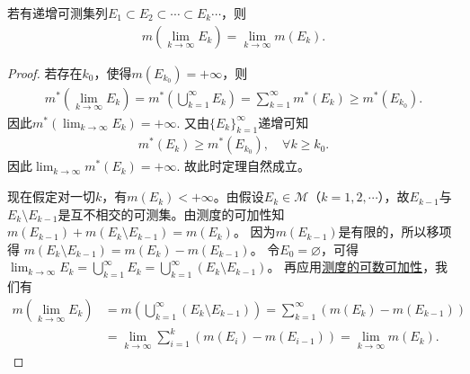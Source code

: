 \documentclass[../../main.tex]{subfiles}
\begin{document}
\begin{theorem}[递增可测集列的测度运算]\label{theorem:递增可测集列的测度运算}
若有递增可测集列$E_1\subset E_2\subset\cdots\subset E_k\cdots$，则
\begin{align}
m\left(\lim_{k\to\infty}E_k\right)=\lim_{k\to\infty}m(E_k).\label{eq:2.4}
\end{align}
\end{theorem}
\begin{proof}
若存在$k_0$，使得$m(E_{k_0})=+\infty$，则
\begin{align*}
m^*\left(\lim_{k\rightarrow \infty}E_k\right) = m^*\left(\bigcup_{k=1}^{\infty}E_k\right) = \sum_{k=1}^{\infty}m^*(E_k) \geqslant m^*(E_{k_0}).
\end{align*}
因此$m^*\left(\lim_{k\rightarrow \infty}E_k\right) = +\infty$. 又由$\{E_k\}_{k=1}^{\infty}$递增可知
\begin{align*}
m^*(E_k) \geqslant m^*(E_{k_0}), \quad \forall k \geqslant k_0.
\end{align*}
因此$\lim_{k\rightarrow \infty}m^*(E_k) = +\infty$.
故此时定理自然成立。

现在假定对一切$k$，有$m(E_k)<+\infty$。由假设$E_k\in\mathscr{M}$（$k = 1,2,\cdots$），故$E_{k - 1}$与$E_k\setminus E_{k - 1}$是互不相交的可测集。由测度的可加性知
$m(E_{k - 1})+m(E_k\setminus E_{k - 1})=m(E_k)$。
因为$m(E_{k - 1})$是有限的，所以移项得
$m(E_k\setminus E_{k - 1})=m(E_k)-m(E_{k - 1})$。
令$E_0 = \varnothing$，可得
$\lim_{k\to\infty}E_k=\bigcup_{k = 1}^{\infty}E_k=\bigcup_{k = 1}^{\infty}(E_k\setminus E_{k - 1})$。
再应用\hyperref[theorem:测度的基本性质]{测度的可数可加性}，我们有
\begin{align*}
m\left(\lim_{k\to\infty}E_k\right)&=m\left(\bigcup_{k = 1}^{\infty}(E_k\setminus E_{k - 1})\right)
=\sum_{k = 1}^{\infty}(m(E_k)-m(E_{k - 1}))\\
&=\lim_{k\to\infty}\sum_{i = 1}^{k}(m(E_i)-m(E_{i - 1}))
=\lim_{k\to\infty}m(E_k).
\end{align*}
\end{proof}
\end{document}
